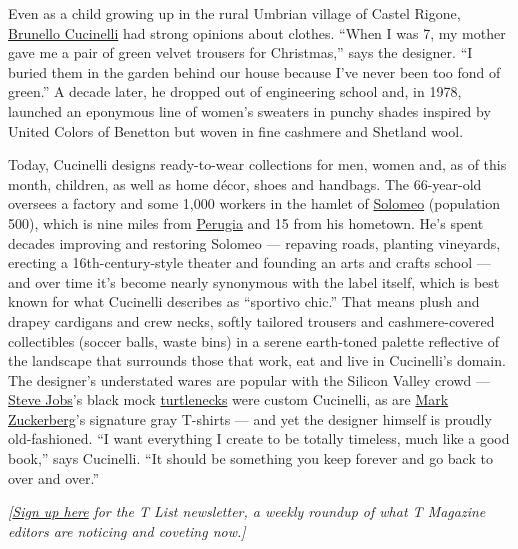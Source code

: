 Even as a child growing up in the rural Umbrian village of Castel
Rigone, \href{http://www.brunellocucinelli.com/en/}{Brunello Cucinelli}
had strong opinions about clothes. ``When I was 7, my mother gave me a
pair of green velvet trousers for Christmas,'' says the designer. ``I
buried them in the garden behind our house because I've never been too
fond of green.'' A decade later, he dropped out of engineering school
and, in 1978, launched an eponymous line of women's sweaters in punchy
shades inspired by United Colors of Benetton but woven in fine cashmere
and Shetland wool.

Today, Cucinelli designs ready-to-wear collections for men, women and,
as of this month, children, as well as home décor, shoes and handbags.
The 66-year-old oversees a factory and some 1,000 workers in the hamlet
of
\href{https://www.nytimes3xbfgragh.onion/2018/09/21/fashion/brunello-cucinelli-italy.html}{Solomeo}
(population 500), which is nine miles from
\href{https://www.nytimes3xbfgragh.onion/interactive/2017/09/14/travel/what-to-do-36-hours-in-perugia-italy.html}{Perugia}
and 15 from his hometown. He's spent decades improving and restoring
Solomeo --- repaving roads, planting vineyards, erecting a
16th-century-style theater and founding an arts and crafts school ---
and over time it's become nearly synonymous with the label itself, which
is best known for what Cucinelli describes as ``sportivo chic.'' That
means plush and drapey cardigans and crew necks, softly tailored
trousers and cashmere-covered collectibles (soccer balls, waste bins) in
a serene earth-toned palette reflective of the landscape that surrounds
those that work, eat and live in Cucinelli's domain. The designer's
understated wares are popular with the Silicon Valley crowd ---
\href{https://www.nytimes3xbfgragh.onion/topic/person/steve-jobs}{Steve
Jobs}'s black mock
\href{https://www.nytimes3xbfgragh.onion/2016/01/03/magazine/can-the-turtleneck-ever-be-cool-again.html}{turtlenecks}
were custom Cucinelli, as are
\href{https://www.nytimes3xbfgragh.onion/topic/person/mark-zuckerberg}{Mark
Zuckerberg}'s signature gray T-shirts --- and yet the designer himself
is proudly old-fashioned. ``I want everything I create to be totally
timeless, much like a good book,'' says Cucinelli. ``It should be
something you keep forever and go back to over and over.''

\emph{{[}}\href{https://www.nytimes3xbfgragh.onion/newsletters/t-list?module=inline}{\emph{Sign
up here}} \emph{for the T List newsletter, a weekly roundup of what T
Magazine editors are noticing and coveting now.{]}}

